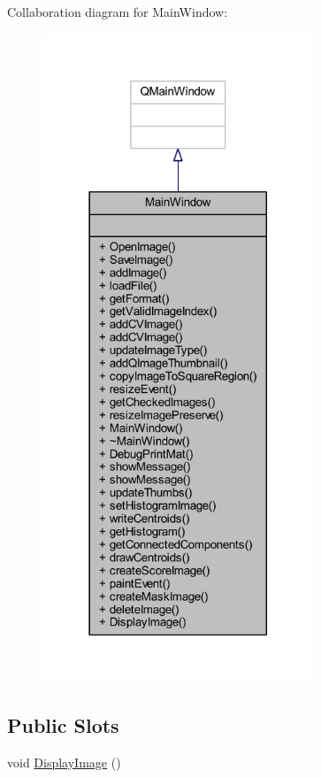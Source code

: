 Collaboration diagram for Main\+Window\+:
\nopagebreak
\begin{figure}[H]
\begin{center}
\leavevmode
\includegraphics[height=550pt]{class_main_window__coll__graph}
\end{center}
\end{figure}
\subsection*{Public Slots}
\begin{DoxyCompactItemize}
\item 
void \hyperlink{class_main_window_a8e20e1254b179ca9ec054ec908d9cc43}{Display\+Image} ()
\end{DoxyCompactItemize}
